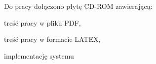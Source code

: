 \newline
Do pracy dołączono płytę CD-ROM zawierającą:
\begin{itemize*}
	\item treść pracy w pliku PDF,
	\item treść pracy w formacie LATEX,
	\item implementację systemu \textsl{\NazwaSys}
\end{itemize*} 
